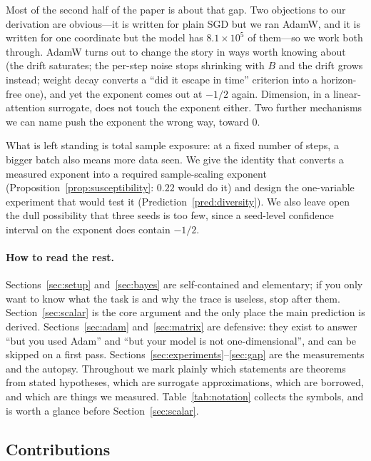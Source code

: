 \documentclass{article}
\theoremstyle{plain}
\theoremstyle{definition}
\theoremstyle{remark}
\newcommand{\1}{\mathbf{1}}
\begin{document}
Most of the second half of the paper is about that gap. Two objections to our
derivation are obvious---it is written for plain SGD but we ran AdamW, and it is
written for one coordinate but the model has $8.1\times10^5$ of them---so we work
both through. AdamW turns out to change the story in ways worth knowing about
(the drift saturates; the per-step noise stops shrinking with $B$ and the drift
grows instead; weight decay converts a ``did it escape in time'' criterion into a
horizon-free one), and yet the exponent comes out at $-1/2$ again. Dimension, in
a linear-attention surrogate, does not touch the exponent either. Two further
mechanisms we can name push the exponent the wrong way, toward $0$.

What is left standing is total sample exposure: at a fixed number of steps, a
bigger batch also means more data seen. We give the identity that converts a
measured exponent into a required sample-scaling exponent
(Proposition~\ref{prop:susceptibility}: $0.22$ would do it) and design the
one-variable experiment that would test it (Prediction~\ref{pred:diversity}).
We also leave open the dull possibility that three seeds is too few, since a
seed-level confidence interval on the exponent does contain $-1/2$.

\paragraph{How to read the rest.}
Sections~\ref{sec:setup} and~\ref{sec:bayes} are self-contained and elementary;
if you only want to know what the task is and why the trace is useless, stop
after them. Section~\ref{sec:scalar} is the core argument and the only place the
main prediction is derived. Sections~\ref{sec:adam} and~\ref{sec:matrix} are
defensive: they exist to answer ``but you used Adam'' and ``but your model is not
one-dimensional'', and can be skipped on a first pass.
Sections~\ref{sec:experiments}--\ref{sec:gap} are the measurements and the
autopsy. Throughout we mark plainly which statements are theorems from stated
hypotheses, which are surrogate approximations, which are borrowed, and which are
things we measured. Table~\ref{tab:notation} collects the symbols, and is worth a
glance before Section~\ref{sec:scalar}.

\subsection{Contributions}
\end{document}
